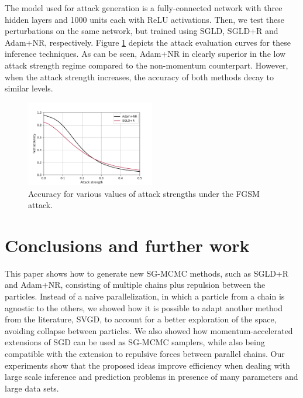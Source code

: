 The model used for attack generation is a fully-connected network with three hidden layers and 1000 units each with ReLU activations. Then, we test these perturbations on the same network, but trained using SGLD, SGLD+R and Adam+NR, respectively. Figure \ref{fig:attacks} depicts the attack evaluation curves for these inference techniques. As can be seen, Adam+NR in clearly superior in the low attack strength regime compared to the non-momentum counterpart. However, when the attack strength increases, the accuracy of both methods decay to similar levels.



\begin{figure}[h]
    \centering
\includegraphics[width=0.5\textwidth]{img/adv-2}
    \caption{Accuracy for various values of attack strengths under the FGSM attack.}\label{fig:attacks}
\end{figure}





\section{Conclusions and further work}\label{sec:conclusion}

This paper shows how to generate new SG-MCMC methods, such as SGLD+R and Adam+NR, consisting of multiple chains plus repulsion between the particles. Instead of a naive parallelization, in which a particle from a chain is agnostic to the others, we showed how it is possible to adapt another method from the literature, SVGD, to account for a better exploration of the space, avoiding collapse between particles. We also showed how momentum-accelerated extensions of SGD can be used as SG-MCMC samplers, while also being compatible with the extension to repulsive forces between parallel chains. Our 
experiments show that the proposed ideas improve efficiency when dealing 
with large scale inference and prediction problems in presence of many 
parameters and large data sets.

